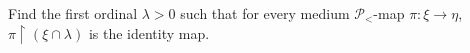 Find the first ordinal $\lambda > 0$ such that for every medium $\mathcal{P}_{<}$-map $\pi: \xi \rightarrow \eta$, $\pi \upharpoonright (\xi \cap \lambda)$ is the identity map.

